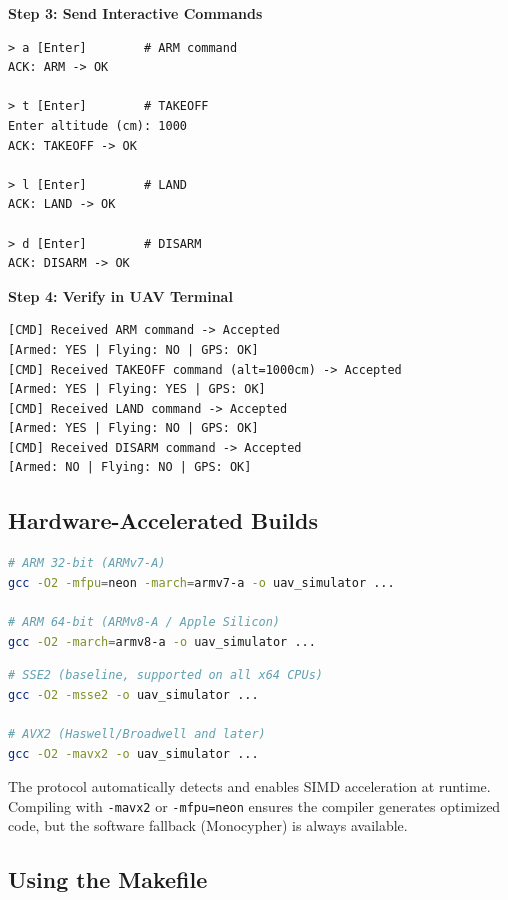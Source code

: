 \documentclass[11pt,a4paper]{article}
\begin{document}
\textbf{Step 3: Send Interactive Commands}
\begin{lstlisting}[language={}]
> a [Enter]        # ARM command
ACK: ARM -> OK

> t [Enter]        # TAKEOFF
Enter altitude (cm): 1000
ACK: TAKEOFF -> OK

> l [Enter]        # LAND
ACK: LAND -> OK

> d [Enter]        # DISARM
ACK: DISARM -> OK
\end{lstlisting}

\textbf{Step 4: Verify in UAV Terminal}
\begin{lstlisting}[language={}]
[CMD] Received ARM command -> Accepted
[Armed: YES | Flying: NO | GPS: OK]
[CMD] Received TAKEOFF command (alt=1000cm) -> Accepted
[Armed: YES | Flying: YES | GPS: OK]
[CMD] Received LAND command -> Accepted
[Armed: YES | Flying: NO | GPS: OK]
[CMD] Received DISARM command -> Accepted
[Armed: NO | Flying: NO | GPS: OK]
\end{lstlisting}

\subsection{Hardware-Accelerated Builds}

\begin{lstlisting}[language=bash,caption={ARM NEON (Raspberry Pi, Jetson, Apple Silicon)}]
# ARM 32-bit (ARMv7-A)
gcc -O2 -mfpu=neon -march=armv7-a -o uav_simulator ...

# ARM 64-bit (ARMv8-A / Apple Silicon)
gcc -O2 -march=armv8-a -o uav_simulator ...
\end{lstlisting}

\begin{lstlisting}[language=bash,caption={x86 SIMD (modern Intel/AMD processors)}]
# SSE2 (baseline, supported on all x64 CPUs)
gcc -O2 -msse2 -o uav_simulator ...

# AVX2 (Haswell/Broadwell and later)
gcc -O2 -mavx2 -o uav_simulator ...
\end{lstlisting}

\begin{notebox}
The protocol automatically detects and enables SIMD acceleration at runtime. Compiling with \texttt{-mavx2} or \texttt{-mfpu=neon} ensures the compiler generates optimized code, but the software fallback (Monocypher) is always available.
\end{notebox}

\subsection{Using the Makefile}
\end{document}
